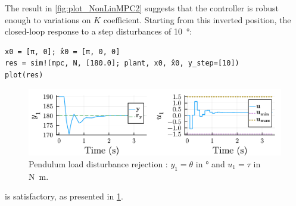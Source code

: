 The result in \cref{fig:plot_NonLinMPC2} suggests that the controller is robust enough to variations on $K$ coefficient. Starting from this inverted position, the closed-loop response to a step disturbances of \SI{10}{\degree}:

\begin{verbatim}
x0 = [π, 0]; x̂0 = [π, 0, 0]
res = sim!(mpc, N, [180.0]; plant, x0, x̂0, y_step=[10])
plot(res)
\end{verbatim}

\begin{figure}[h]
    \centering
    \includegraphics[width=\columnwidth]{fig/plot_NonLinMPC3.pdf}
    \caption{Pendulum load disturbance rejection : $y_1 = \theta$ in \si{\degree} and $u_1 = \tau$ in \si{\newton\meter}.}
    \label{fig:plot_NonLinMPC3}
\end{figure}

is satisfactory, as presented in \cref{fig:plot_NonLinMPC3}.

